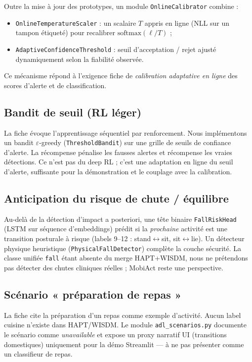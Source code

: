 Outre la mise à jour des prototypes, un module
\texttt{OnlineCalibrator} combine :
\begin{itemize}
  \item \texttt{OnlineTemperatureScaler} : un scalaire $T$ appris en ligne
  (NLL sur un tampon étiqueté) pour recalibrer $\mathrm{softmax}(\ell/T)$ ;
  \item \texttt{AdaptiveConfidenceThreshold} : seuil d'acceptation / rejet
  ajusté dynamiquement selon la fiabilité observée.
\end{itemize}
Ce mécanisme répond à l'exigence fiche de \emph{calibration adaptative en ligne}
des scores d'alerte et de classification.

\subsection{Bandit de seuil (RL léger)}

La fiche évoque l'apprentissage séquentiel par renforcement. Nous
implémentons un bandit $\varepsilon$-greedy (\texttt{ThresholdBandit}) sur une
grille de seuils de confiance d'alerte. La récompense pénalise les fausses
alertes et récompense les vraies détections. Ce n'est pas du deep RL ; c'est
une adaptation en ligne du seuil d'alerte, suffisante pour la démonstration
et le couplage avec la calibration.

\subsection{Anticipation du risque de chute / équilibre}

Au-delà de la détection d'impact a posteriori, une tête binaire
\texttt{FallRiskHead} (LSTM sur séquence d'embeddings) prédit si la
\emph{prochaine} activité est une transition posturale à risque
(labels 9--12 : stand$\leftrightarrow$sit, sit$\leftrightarrow$lie). Un
détecteur physique heuristique (\texttt{PhysicalFallDetector}) complète la
couche sécurité. La classe unifiée \texttt{fall} étant absente du merge
HAPT+WISDM, nous ne prétendons pas détecter des chutes cliniques réelles ;
MobiAct reste une perspective.

\subsection{Scénario « préparation de repas »}

La fiche cite la préparation d'un repas comme exemple d'activité. Aucun
label cuisine n'existe dans HAPT/WISDM. Le module
\texttt{adl\_scenarios.py} documente le scénario comme \emph{unavailable}
et expose un proxy narratif UI (transitions domestiques) uniquement pour
la démo Streamlit — à ne pas présenter comme un classifieur de repas.

